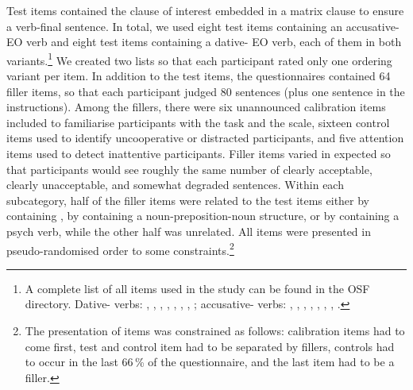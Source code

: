 \documentclass[output=paper,colorlinks,citecolor=brown]{langscibook}
\begin{document}
Test items contained the clause of interest embedded in a matrix clause to ensure a verb-final sentence. 
In total, we used eight test items containing an accusative- EO verb and eight test items containing a dative- EO verb, each of them in both  variants.\footnote{A complete list of all items used in the study can be found in the OSF directory. Dative- verbs: , , , , , , , ;
accusative- verbs: , , , , , , , .} 
We created two lists so that each participant rated only one ordering variant per item.
In addition to the test items, the questionnaires contained 64 filler items, so that each participant judged 80 sentences (plus one sentence in the instructions).
Among the fillers, there were six unannounced calibration items included to familiarise participants with the task and the scale, sixteen control items used to identify uncooperative or distracted participants, and five attention items used to detect inattentive participants.
Filler items varied in expected  so that participants would see roughly the same number of clearly acceptable, clearly unacceptable, and somewhat degraded sentences.
Within each subcategory, half of the filler items were related to the test items either by containing , by containing a noun-preposition-noun structure, or by containing a psych verb, while the other half was unrelated.
All items were presented in pseudo-randomised order  to some constraints.\footnote{The presentation of items was constrained as follows: calibration items had to come first, test and control item had to be separated by fillers, controls had to occur in the last 66\,\% of the questionnaire, and the last item had to be a filler.}
\end{document}
